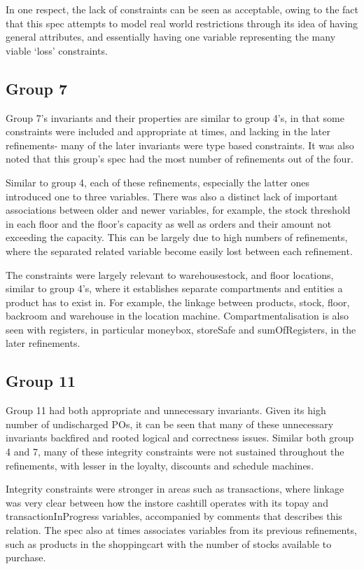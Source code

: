 In one respect, the lack of constraints can be seen as acceptable, owing to the fact that this spec attempts to model real world restrictions through its idea of having general attributes, and essentially having one variable representing the many viable ‘loss’ constraints. 

\subsection{Group 7}
\label{group7}

Group 7’s invariants and their properties are similar to group 4’s, in that some constraints were included and appropriate at times, and lacking in the later refinements- many of the later invariants were type based constraints. It was also noted that this group’s spec had the most number of refinements out of the four.

Similar to group 4, each of these refinements, especially the latter ones introduced one to three variables. There was also a distinct lack of important associations between older and newer variables, for example, the stock threshold in each floor and the floor’s capacity as well as orders and their amount not exceeding the capacity. This can be largely due to high numbers of refinements, where the separated related variable become easily lost between each refinement.

The constraints were largely relevant to warehousestock, and floor locations, similar to group 4’s, where it establishes separate compartments and entities a product has to exist in. For example, the linkage between products, stock, floor, backroom and warehouse in the location machine. Compartmentalisation is also seen with registers, in particular moneybox, storeSafe and sumOfRegisters, in the later refinements. 

\subsection{Group 11}
\label{group11}

Group 11 had both appropriate and unnecessary invariants. Given its high number of undischarged POs, it can be seen that many of these unnecessary invariants backfired and rooted logical and correctness issues. Similar both group 4 and 7, many of these integrity constraints were not sustained throughout the refinements, with lesser in the loyalty, discounts and schedule machines. 

Integrity constraints were stronger in areas such as transactions, where linkage was very clear between how the instore cashtill operates with its topay and transactionInProgress variables, accompanied by comments that describes this relation. The spec also at times associates variables from its previous refinements, such as products in the shoppingcart with the number of stocks available to purchase.

